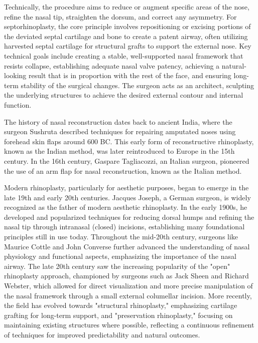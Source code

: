 Technically, the procedure aims to reduce or augment specific areas of the nose, refine the nasal tip, straighten the dorsum, and correct any asymmetry. For septorhinoplasty, the core principle involves repositioning or excising portions of the deviated septal cartilage and bone to create a patent airway, often utilizing harvested septal cartilage for structural grafts to support the external nose. Key technical goals include creating a stable, well-supported nasal framework that resists collapse, establishing adequate nasal valve patency, achieving a natural-looking result that is in proportion with the rest of the face, and ensuring long-term stability of the surgical changes. The surgeon acts as an architect, sculpting the underlying structures to achieve the desired external contour and internal function.

The history of nasal reconstruction dates back to ancient India, where the surgeon Sushruta described techniques for repairing amputated noses using forehead skin flaps around 600 BC. This early form of reconstructive rhinoplasty, known as the Indian method, was later reintroduced to Europe in the 15th century. In the 16th century, Gaspare Tagliacozzi, an Italian surgeon, pioneered the use of an arm flap for nasal reconstruction, known as the Italian method.

Modern rhinoplasty, particularly for aesthetic purposes, began to emerge in the late 19th and early 20th centuries. Jacques Joseph, a German surgeon, is widely recognized as the father of modern aesthetic rhinoplasty. In the early 1900s, he developed and popularized techniques for reducing dorsal humps and refining the nasal tip through intranasal (closed) incisions, establishing many foundational principles still in use today. Throughout the mid-20th century, surgeons like Maurice Cottle and John Converse further advanced the understanding of nasal physiology and functional aspects, emphasizing the importance of the nasal airway. The late 20th century saw the increasing popularity of the "open" rhinoplasty approach, championed by surgeons such as Jack Sheen and Richard Webster, which allowed for direct visualization and more precise manipulation of the nasal framework through a small external columellar incision. More recently, the field has evolved towards "structural rhinoplasty," emphasizing cartilage grafting for long-term support, and "preservation rhinoplasty," focusing on maintaining existing structures where possible, reflecting a continuous refinement of techniques for improved predictability and natural outcomes.


